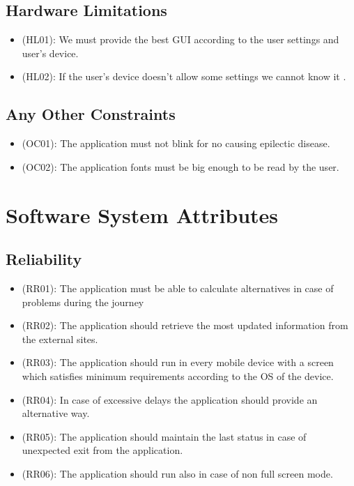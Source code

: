 \documentclass[a4paper,leqno]{book}
\begin{document}
\subsection{Hardware Limitations}
\begin{itemize}
\item (HL01): We must provide the best GUI according to the user settings and user's device.
\item (HL02): If the user's device doesn't allow some settings we cannot know it .
\end{itemize}

\subsection{Any Other Constraints}
\begin{itemize}
\item (OC01): The application must not blink for no causing epilectic disease.
\item (OC02): The application fonts must be big enough to be read by the user.
\end{itemize}

\section{Software System Attributes}

\subsection{Reliability}
\begin{itemize}
\item (RR01): The application must be able to calculate alternatives in case of problems during the journey
\item (RR02): The application should retrieve the most updated information from the external sites.
\item (RR03): The application should run in every mobile device with a screen which satisfies minimum requirements according to the OS of the device.
\item (RR04): In case of excessive delays the application should provide an alternative way.
\item (RR05): The application should maintain the last status in case of unexpected exit from the application.
\item (RR06): The application should run also in case of non full screen mode.
\end{itemize}
\end{document}
